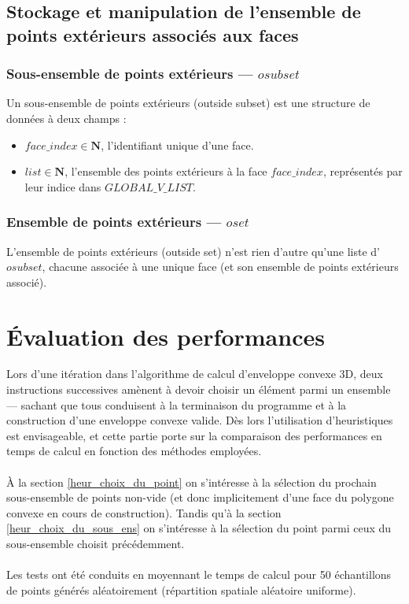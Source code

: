 \documentclass[]{article}
\begin{document}
\begin{multicols}{2}
\subsection{Stockage et manipulation de l'ensemble de points extérieurs associés aux faces}
	\subsubsection{Sous-ensemble de points extérieurs — $osubset$}
	Un sous-ensemble de points extérieurs (outside subset) est une structure de données à deux champs :
	\begin{itemize}
		\item $face\_index \in \mathbf{N}$, l'identifiant unique d'une face.
		\item $list \in \mathbf{N}$, l'ensemble des points extérieurs à la face $face\_index$, représentés par leur indice dans $GLOBAL\_V\_LIST$.
	\end{itemize}

	\subsubsection{Ensemble de points extérieurs — $oset$}
	L'ensemble de points extérieurs (outside set) n'est rien d'autre qu'une liste d'$osubset$, chacune associée à une unique face (et son ensemble de points extérieurs associé).
	

\section{Évaluation des performances}
	Lors d'une itération dans l'algorithme de calcul d'enveloppe convexe 3D, deux instructions successives amènent à devoir choisir un élément parmi un ensemble — sachant que tous conduisent à la terminaison du programme et à la construction d'une enveloppe convexe valide. Dès lors l'utilisation d'heuristiques est envisageable, et cette partie porte sur la comparaison des performances en temps de calcul en fonction des méthodes employées.\\\\
	À la section \ref{heur_choix_du_point} on s'intéresse à la sélection du prochain sous-ensemble de points non-vide (et donc implicitement d'une face du polygone convexe en cours de construction).
	Tandis qu'à la section \ref{heur_choix_du_sous_ens} on s'intéresse à la sélection du point parmi ceux du sous-ensemble choisit précédemment.\\\\
	Les tests ont été conduits en moyennant le temps de calcul pour 50 échantillons de points générés aléatoirement (répartition spatiale aléatoire uniforme).
	

\end{multicols}
\end{document}
